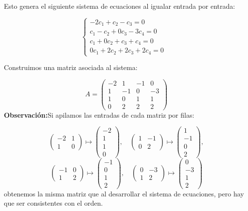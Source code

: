 \documentclass[a4paper]{article}
\begin{document}
\begin{enumerate}
Esto genera el siguiente sistema de ecuaciones al igualar entrada por entrada:

\[
\begin{cases}
-2c_1 + c_2 - c_3 = 0 &  \\
c_1 - c_2 + 0c_3 - 3c_4 = 0 &  \\
c_1 + 0c_2 + c_3 + c_4 = 0 &  \\
0c_1 + 2c_2 + 2c_3 + 2c_4 = 0 & 
\end{cases}
\]

Construimos una matriz asociada al sistema:

\[
A = 
\begin{pmatrix}
-2 & 1 & -1 & 0 \\
1 & -1 & 0 & -3 \\
1 & 0 & 1 & 1 \\
0 & 2 & 2 & 2
\end{pmatrix}
\]
\textbf{Observación:}Si apilamos las entradas de cada matriz por filas:

\[
\begin{pmatrix} -2 & 1 \\ 1 & 0 \end{pmatrix} \mapsto \begin{pmatrix} -2 \\ 1 \\ 1 \\ 0 \end{pmatrix}, \quad
\begin{pmatrix} 1 & -1 \\ 0 & 2 \end{pmatrix} \mapsto \begin{pmatrix} 1 \\ -1 \\ 0 \\ 2 \end{pmatrix},
\]
\[
\begin{pmatrix} -1 & 0 \\ 1 & 2 \end{pmatrix} \mapsto \begin{pmatrix} -1 \\ 0 \\ 1 \\ 2 \end{pmatrix}, \quad
\begin{pmatrix} 0 & -3 \\ 1 & 2 \end{pmatrix} \mapsto \begin{pmatrix} 0 \\ -3 \\ 1 \\ 2 \end{pmatrix}
\]
obtenemos la misma matriz que al desarrollar el sistema de ecuaciones, pero hay que ser consistentes con el orden.


\end{enumerate}
\end{document}

